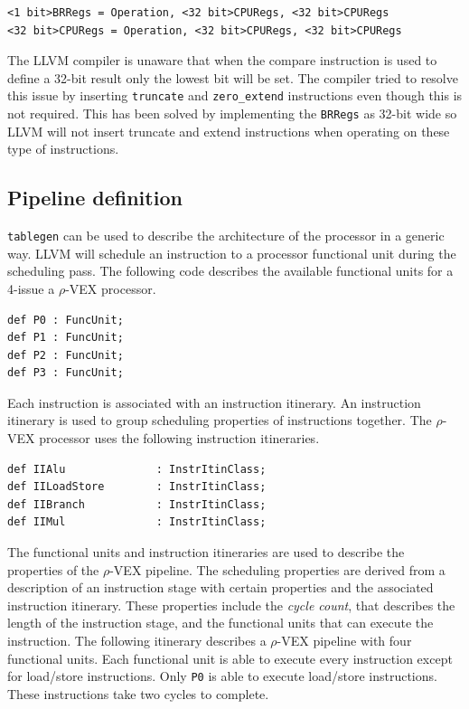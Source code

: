 \begin{lstlisting}
<1 bit>BRRegs = Operation, <32 bit>CPURegs, <32 bit>CPURegs
<32 bit>CPURegs = Operation, <32 bit>CPURegs, <32 bit>CPURegs
\end{lstlisting}

The LLVM compiler is unaware that when the compare instruction is used to define a 32-bit result only the lowest bit will be set. The compiler tried to resolve this issue by inserting \texttt{truncate} and \texttt{zero\_extend} instructions even though this is not required. This has been solved by implementing the \texttt{BRRegs} as 32-bit wide so LLVM will not insert truncate and extend instructions when operating on these type of instructions.

\subsection{Pipeline definition}
\texttt{tablegen} can be used to describe the architecture of the processor in a generic way. LLVM will schedule an instruction to a processor functional unit during the scheduling pass. The following code describes the available functional units for a 4-issue a $\rho$-VEX processor.

\begin{lstlisting}[language=tblgen]
def P0 : FuncUnit;
def P1 : FuncUnit;
def P2 : FuncUnit;
def P3 : FuncUnit;
\end{lstlisting}

Each instruction is associated with an instruction itinerary. An instruction itinerary is used to group scheduling properties of instructions together. The $\rho$-VEX processor uses the following instruction itineraries.

\begin{lstlisting}[language=tblgen]
def IIAlu              : InstrItinClass;
def IILoadStore        : InstrItinClass;
def IIBranch           : InstrItinClass;
def IIMul              : InstrItinClass;
\end{lstlisting}

The functional units and instruction itineraries are used to describe the properties of the $\rho$-VEX pipeline. The scheduling properties are derived from a description of an instruction stage with certain properties and the associated instruction itinerary. These properties include the \emph{cycle count}, that describes the length of the instruction stage, and the functional units that can execute the instruction. The following itinerary describes a $\rho$-VEX pipeline with four functional units. Each functional unit is able to execute every instruction except for load/store instructions. Only \texttt{P0} is able to execute load/store instructions. These instructions take two cycles to complete.

